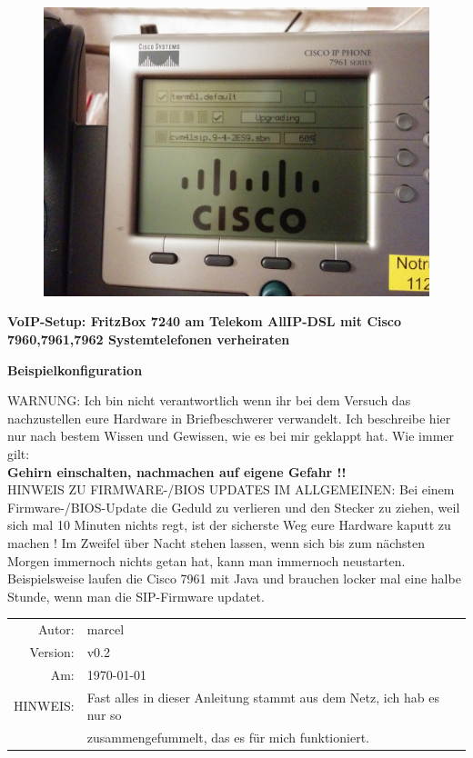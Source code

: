 \documentclass[a4paper,12pt]{scrbook}
\begin{document}
\begin{titlepage}

\begin{figure}[H]
\begin{center}
\includegraphics[width=.7\hsize]{./images/ciscoupdate.jpg}
\end{center}
\end{figure}


\begin{center}
{\huge\bfseries VoIP-Setup: FritzBox 7240 am Telekom AllIP-DSL mit Cisco 7960,7961,7962 Systemtelefonen verheiraten\par}
\vskip 1cm
\textbf{Beispielkonfiguration}

WARNUNG: Ich bin nicht verantwortlich wenn ihr bei dem Versuch das nachzustellen eure Hardware in Briefbeschwerer verwandelt. Ich
beschreibe hier nur nach bestem Wissen und Gewissen, wie es bei mir geklappt hat. Wie immer gilt:\\
\textbf{Gehirn einschalten, nachmachen auf eigene Gefahr !!}\\
HINWEIS ZU FIRMWARE-/BIOS UPDATES IM ALLGEMEINEN: Bei einem Firmware-/BIOS-Update die Geduld zu verlieren und den Stecker zu ziehen,
weil sich mal 10 Minuten nichts regt, ist der sicherste Weg eure Hardware kaputt zu machen ! Im Zweifel über Nacht stehen lassen, wenn
sich bis zum nächsten Morgen immernoch nichts getan hat, kann man immernoch neustarten. Beispielsweise laufen die Cisco 7961 mit Java und
brauchen locker mal eine halbe Stunde, wenn man die SIP-Firmware updatet. 
\end{center} 
\vfill
\flushleft
\begin{tabular}{rl}
Autor: & marcel\\ 
Version: & v0.2\\
Am: & \today\\
HINWEIS: &Fast alles in dieser Anleitung stammt aus dem Netz, ich hab es nur so\\ &zusammengefummelt, das es für mich funktioniert.\\
\end{tabular}
\end{titlepage}
\end{document}
